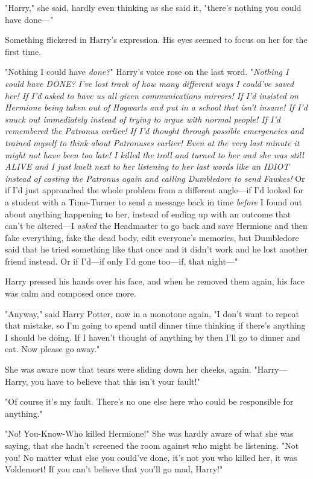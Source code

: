 "Harry," she said, hardly even thinking as she said it, "there's nothing you
could have done---"

Something flickered in Harry's expression. His eyes seemed to focus on her for
the first time.

"Nothing I could have \emph{done?}" Harry's voice rose on the last word.
"\emph{Nothing I could have DONE? I've lost track of how many different ways I
could've saved her! If I'd asked to have us all given communications mirrors!
If I'd insisted on Hermione being taken out of Hogwarts and put in a school
that isn't insane! If I'd snuck out immediately instead of trying to argue with
normal people! If I'd remembered the Patronus earlier! If I'd thought through
possible emergencies and trained myself to think about Patronuses earlier! Even
at the very last minute it might not have been too late! I killed the troll and
turned to her and she was still ALIVE and I just knelt next to her listening to
her last words like an IDIOT instead of casting the Patronus again and calling
Dumbledore to send Fawkes!} Or if I'd just approached the whole problem from a
different angle---if I'd looked for a student with a Time-Turner to send a
message back in time \emph{before} I found out about anything happening to her,
instead of ending up with an outcome that can't be altered---I \emph{asked} the
Headmaster to go back and save Hermione and then fake everything, fake the dead
body, edit everyone's memories, but Dumbledore said that he tried something
like that once and it didn't work and he lost another friend instead. Or if
I'd---if only I'd gone too---if, that night---"

Harry pressed his hands over his face, and when he removed them again, his face
was calm and composed once more.

"Anyway," said Harry Potter, now in a monotone again, "I don't want to repeat
that mistake, so I'm going to spend until dinner time thinking if there's
anything I should be doing. If I haven't thought of anything by then I'll go to
dinner and eat. Now please go away."

She was aware now that tears were sliding down her cheeks, again.
"Harry---Harry, you have to believe that this isn't your fault!"

"Of course it's my fault. There's no one else here who could be responsible for
anything."

"No! You-Know-Who killed Hermione!" She was hardly aware of what she was
saying, that she hadn't screened the room against who might be listening. "Not
you! No matter what else you could've done, it's not you who killed her, it was
Voldemort! If you can't believe that you'll go mad, Harry!"

